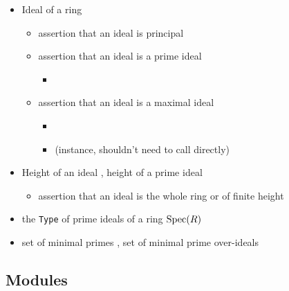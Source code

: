 \begin{itemize}
\item
Ideal of a ring 
\begin{itemize}
\item
assertion that an ideal is principal 
\item
assertion that an ideal is a prime ideal 
\begin{itemize}
\item
{}
\end{itemize}
\item
assertion that an ideal is a maximal ideal 
\begin{itemize}
\item
{}
\item
{} (instance, shouldn't need to call directly)
\end{itemize}
\end{itemize}
\item
Height of an ideal ,
height of a prime ideal 
\begin{itemize}
\item
assertion that an ideal is the whole ring or of finite height 
\end{itemize}
\item
the \verb|Type| of prime ideals of a ring ${\mathrm{Spec}}(R)$ 
\item
set of minimal primes ,
set of minimal prime over-ideals 
\end{itemize}

\subsection{Modules}

